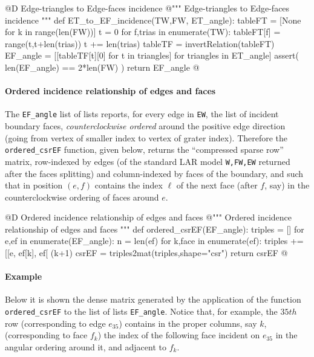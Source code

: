 \documentclass[11pt,oneside]{article}    %
\begin{document}
@D Edge-triangles to Edge-faces incidence
@{""" Edge-triangles to Edge-faces incidence """
def ET_to_EF_incidence(TW,FW, ET_angle):
    tableFT = [None for k in range(len(FW))]
    t = 0
    for f,trias in enumerate(TW):
        tableFT[f] = range(t,t+len(trias))
        t += len(trias)
    tableTF = invertRelation(tableFT)
    EF_angle = [[tableTF[t][0] for t in triangles] for triangles in ET_angle]
    assert( len(EF_angle) == 2*len(FW) )
    return EF_angle
@}


\paragraph{Ordered incidence relationship of edges and faces}

The \texttt{EF\_angle} list of lists reports, for every edge in \texttt{EW}, the list of incident boundary faces, \emph{counterclockwise ordered} around the positive edge direction (going from vertex of smaller index to vertex of grater index). Therefore the \texttt{ordered\_csrEF} function, given below, returns the ``compressed sparse row'' matrix, row-indexed by edges (of the standard LAR model \texttt{W,FW,EW} returned after the faces splitting) and column-indexed by faces of the boundary, and such that in position $(e,f)$ contains the index $\ell$ of the next face (after $f$, say) in the counterclockwise ordering of faces around $e$.

@D Ordered incidence relationship of edges and faces
@{""" Ordered incidence relationship of edges and faces """
def ordered_csrEF(EF_angle):
    triples = []
    for e,ef in enumerate(EF_angle):
        n = len(ef)
        for k,face in enumerate(ef):
            triples += [[e, ef[k], ef[ (k+1)%
    csrEF = triples2mat(triples,shape="csr")
    return csrEF
@}

\paragraph{Example}
Below it is shown the dense matrix generated by the application of the function \texttt{ordered\_csrEF} to the list of lists \texttt{EF\_angle}. Notice that, for example, the $35th$ row (corresponding to edge $e_{35}$) contains in the proper columns, say $k$, (corresponding to face $f_{k}$) the index of the following face incident on $e_{35}$ in the angular ordering around it, and adjacent to $f_k$.
\end{document}
